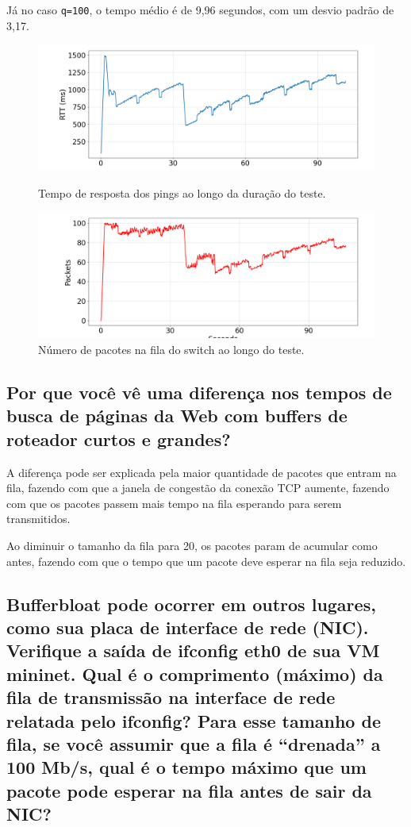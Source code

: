 \documentclass[a4paper,12pt]{article}
\newcommand{\code}[1]{\texttt{#1}}
\begin{document}
\newpage

Já no caso \code{q=100}, o tempo médio é de 9,96 segundos, com um desvio padrão de 3,17.

\begin{figure}[h!]
  \centering
  \includegraphics[width=0.5\columnwidth]{./bufferbloat/bb-q100/reno-rtt-q100.png}
  \caption{Tempo de resposta dos pings ao longo da duração do teste.}
  \includegraphics[width=0.5\columnwidth]{./bufferbloat/bb-q100/reno-buffer-q100.png}
  \caption{Número de pacotes na fila do switch ao longo do teste.}
\end{figure}

\subsection{Por que você vê uma diferença nos tempos de busca de páginas da Web com buffers de roteador curtos e grandes?}

A diferença pode ser explicada pela maior quantidade de pacotes que entram na fila, fazendo com que a janela de congestão da conexão TCP aumente, fazendo com que os pacotes passem mais tempo na fila esperando para serem transmitidos.

Ao diminuir o tamanho da fila para 20, os pacotes param de acumular como antes, fazendo com que o tempo que um pacote deve esperar na fila seja reduzido.

\subsection{Bufferbloat pode ocorrer em outros lugares, como sua placa de interface de rede (NIC). Verifique a saída de ifconfig eth0 de sua VM mininet. Qual é o comprimento (máximo) da fila de transmissão na interface de rede relatada pelo ifconfig? Para esse tamanho de fila, se você assumir que a fila é “drenada” a 100 Mb/s, qual é o tempo máximo que um pacote pode esperar na fila antes de sair da NIC?
}
\end{document}
